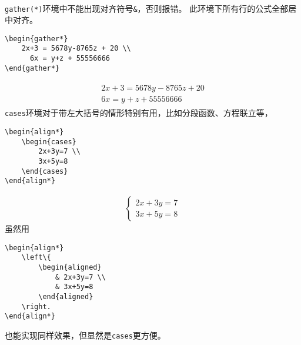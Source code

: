 \documentclass{article}
\begin{document}
\begin{multicols}{2}
\begin{enumerate}
\begin{tcolorbox}
\begin{align*}
                  \end{align*}
              \end{tcolorbox}
              \verb|gather(*)|环境中不能出现对齐符号\verb|&|，否则报错。
              此环境下所有行的公式全部居中对齐。
              \begin{lstlisting}
\begin{gather*}
    2x+3 = 5678y-8765z + 20 \\
      6x = y+z + 55556666 
\end{gather*}    
\end{lstlisting}
              \begin{gather}
                  \boxed{
                      \begin{gathered}
                          2x+3 = 5678y-8765z + 20 \label{aaa2}\\
                          6x = y+z + 55556666
                      \end{gathered} }
              \end{gather}
              \verb|cases|环境对于带左大括号的情形特别有用，比如分段函数、方程联立等，
              \begin{lstlisting}
\begin{align*}
    \begin{cases}
        2x+3y=7 \\
        3x+5y=8
    \end{cases}
\end{align*}    
\end{lstlisting}
              \begin{align*}
                  \boxed{
                      \begin{cases}
                          2x+3y=7 \\
                          3x+5y=8
                      \end{cases} }
              \end{align*}
              虽然用
              \begin{lstlisting}
\begin{align*}
    \left\{  
        \begin{aligned}
            & 2x+3y=7 \\
            & 3x+5y=8
        \end{aligned}  
    \right.
\end{align*}    
\end{lstlisting}
              也能实现同样效果，但显然是\verb|cases|更方便。\\

\end{enumerate}
\end{multicols}
\end{document}

